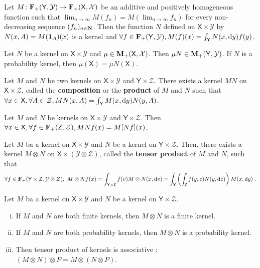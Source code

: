 	\begin{lem}
		Let $M \colon \mathbf{F}_+(\mathsf{Y},\mathcal{Y}) \to \mathbf{F}_+(\mathsf{X},\mathcal{X})$ be an additive and positively homogeneous function such that $\lim_{n \to \infty} M(f_n) = M(\lim_{n \to \infty} f_n)$ for every non-decreasing sequence $(f_n)_{n \in \mathbf{N}}$.
		Then the function $N$ defined on $\mathsf{X} \times \mathcal{Y}$ by $N(x,A) = M(\operatorname{\mathbf{1}}_A)(x)$ is a kernel and $\forall f \in \mathbf{F}_+(\mathsf{Y},\mathcal{Y}), M(f)(x) = \int_{\mathsf{Y}} N(x, \mathop{}\mathopen{}\mathrm{d} y) f(y)$.
	\end{lem}
	
	\begin{pop}
		Let $N$ be a kernel on $\mathsf{X} \times \mathcal{Y}$ and $\mu \in \mathbf{M}_+(\mathsf{X},\mathcal{X})$.
		Then $\mu N \in \mathbf{M}_+(\mathsf{Y},\mathcal{Y})$.
		If $N$ is a probability kernel, then $\mu(\mathsf{X}) = \mu N(\mathsf{X})$.
	\end{pop}

	\begin{pop}
		Let $M$ and $N$ be two kernels on $\mathsf{X} \times \mathcal{Y}$ and $\mathsf{Y} \times \mathcal{Z}$.
		There exists a kernel $MN$ on $\mathsf{X} \times \mathcal{Z}$, called the \textbf{composition} or the \textbf{product} of $M$ and $N$ such that $\forall x \in \mathsf{X}, \forall A \in \mathcal{Z}, MN(x,A) = \int_{\mathsf{Y}} M(x, \mathop{}\mathopen{}\mathrm{d} y) N(y, A)$.
	\end{pop}

	\begin{pop}
		Let $M$ and $N$ be kernels on $\mathsf{X} \times \mathcal{Y}$ and $\mathsf{Y} \times \mathcal{Z}$.
		Then $\forall x \in \mathsf{X}, \forall f \in \mathbf{F}_+(\mathsf{Z},\mathcal{Z}), MNf(x) = M[Nf](x)$.
	\end{pop}
	
	\begin{pop}
		Let $M$ ba a kernel on $\mathsf{X} \times \mathcal{Y}$ and $N$ be a kernel on $\mathsf{Y} \times \mathcal{Z}$.
		Then, there exists a kernel $M \otimes N$ on $\mathsf{X} \times (\mathcal{Y} \otimes \mathcal{Z})$, called the \textbf{tensor product} of $M$ and $N$, such that
		$$\forall f \in \mathbf{F}_+(\mathsf{Y} \times \mathsf{Z}, \mathcal{Y} \otimes \mathcal{Z}),\
		M \otimes N f(x) = \int_{\mathsf{Y} \times \mathsf{Z}} f(v) M \otimes N(x, \mathop{}\mathopen{}\mathrm{d} v)
		                 = \int_{\mathsf{Y}} \left( \int_{\mathsf{Z}} f(y,z) N(y, \mathop{}\mathopen{}\mathrm{d} z) \right) M(x, \mathop{}\mathopen{}\mathrm{d} y)\ .$$
	\end{pop}
	
	\begin{lem}
		Let $M$ ba a kernel on $\mathsf{X} \times \mathcal{Y}$ and $N$ be a kernel on $\mathsf{Y} \times \mathcal{Z}$.
		\begin{enumerate}[(i)]
			\item If $M$ and $N$ are both finite kernels, then $M \otimes N$ is a finite kernel.
			\item If $M$ and $N$ are both probability kernels, then $M \otimes N$ is a probability kernel.
			\item Then tensor product of kernels is associative : $(M \otimes N) \otimes P = M \otimes (N \otimes P)$.
		\end{enumerate}
	\end{lem}


